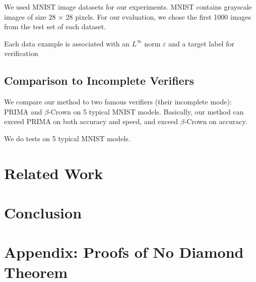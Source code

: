 \documentclass[8pt]{article}
\theoremstyle{definition}
\begin{document}
We used MNIST image datasets for our experiments. MNIST contains grayscale images of size 28 × 28 pixels. For our evaluation, we chose the first
1000 images from the test set of each dataset.

Each data example is associated with an $L^\infty$ norm $\varepsilon$ and a target label
for verification 

\subsection{Comparison to Incomplete Verifiers}

We compare our method to two famous verifiers (their incomplete mode): PRIMA and $\beta$-Crown on 5 typical MNIST models. Basically, our method can exceed PRIMA on both accuracy and speed, and exceed $\beta$-Crown on accuracy. 


We do tests on 5 typical MNIST models.

\section{Related Work}

\section{Conclusion}

\section*{Appendix: Proofs of No Diamond Theorem}
\end{document}
